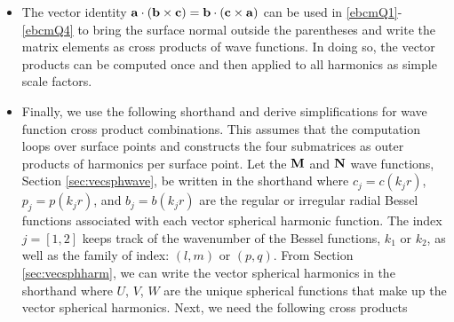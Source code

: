 \begin{itemize}
\item The vector identity $\mathbf{a} \cdot (\mathbf{b} \times \mathbf{c}) = \mathbf{b} \cdot (\mathbf{c} \times \mathbf{a})$ can be used in \eqref{ebcmQ1}-\eqref{ebcmQ4} to bring the surface normal outside the parentheses and write the matrix elements as cross products of wave functions. In doing so, the vector products can be computed once and then applied to all harmonics as simple scale factors.
\item Finally, we use the following shorthand and derive simplifications for wave function cross product combinations. This assumes that the computation loops over surface points and constructs the four submatrices as outer products of harmonics per surface point. Let the $\mathbf{M}$ and $\mathbf{N}$ wave functions, Section \ref{sec:vecsphwave}, be written in the shorthand
\noindent where $c_j = c(k_j r)$, $p_j= p(k_j r)$, and $b_j= b(k_j r)$ are the regular or irregular radial Bessel functions associated with each vector spherical harmonic function. The index $j = [1, 2]$ keeps track of the wavenumber of the Bessel functions, $k_1$ or $k_2$, as well as the family of index: $(l,m)$ or $(p,q)$. From Section \ref{sec:vecsphharm}, we can write the vector spherical harmonics in the shorthand
\noindent where $U$, $V$, $W$ are the unique spherical functions that make up the vector spherical harmonics.  Next, we need the following cross products


\end{itemize}
